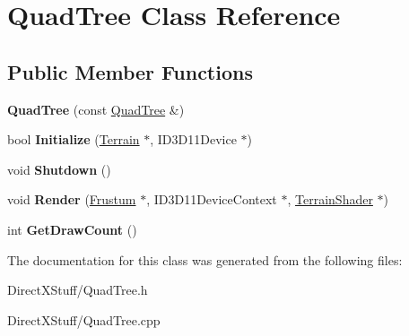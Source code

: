 \hypertarget{class_quad_tree}{\section{Quad\-Tree Class Reference}
\label{class_quad_tree}
}
\subsection*{Public Member Functions}
\begin{DoxyCompactItemize}
\item 
\hypertarget{class_quad_tree_a3991f40b56f632156ce17eea4a697d59}{{\bfseries Quad\-Tree} (const \hyperlink{class_quad_tree}{Quad\-Tree} \&)}\label{class_quad_tree_a3991f40b56f632156ce17eea4a697d59}

\item 
\hypertarget{class_quad_tree_a476b5e3b95dbe551abcbed57c6178a9d}{bool {\bfseries Initialize} (\hyperlink{class_terrain}{Terrain} $\ast$, I\-D3\-D11\-Device $\ast$)}\label{class_quad_tree_a476b5e3b95dbe551abcbed57c6178a9d}

\item 
\hypertarget{class_quad_tree_a8aedcdcda56192f857fcc33e96d3c50c}{void {\bfseries Shutdown} ()}\label{class_quad_tree_a8aedcdcda56192f857fcc33e96d3c50c}

\item 
\hypertarget{class_quad_tree_a2995fbc84a7a55e393a565b6889ac1bd}{void {\bfseries Render} (\hyperlink{class_frustum}{Frustum} $\ast$, I\-D3\-D11\-Device\-Context $\ast$, \hyperlink{class_terrain_shader}{Terrain\-Shader} $\ast$)}\label{class_quad_tree_a2995fbc84a7a55e393a565b6889ac1bd}

\item 
\hypertarget{class_quad_tree_a2f57896b989718922cc5049a9b627cca}{int {\bfseries Get\-Draw\-Count} ()}\label{class_quad_tree_a2f57896b989718922cc5049a9b627cca}

\end{DoxyCompactItemize}


The documentation for this class was generated from the following files\-:\begin{DoxyCompactItemize}
\item 
Direct\-X\-Stuff/Quad\-Tree.\-h\item 
Direct\-X\-Stuff/Quad\-Tree.\-cpp\end{DoxyCompactItemize}
